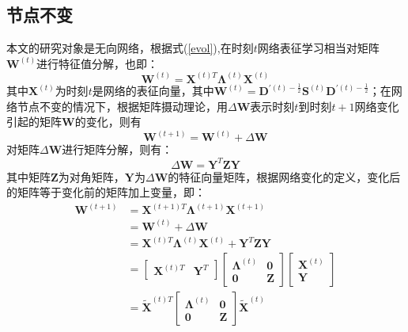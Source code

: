 \subsection{节点不变}
本文的研究对象是无向网络，根据式(\ref{evol}),在时刻$t$网络表征学习相当对矩阵$\textbf{W}^{(t)}$进行特征值分解，也即：
\begin{equation}
	\textbf{W}^{(t)} = \textbf{X}^{(t)T} \bm{\Lambda}^{(t)} \textbf{X} ^{(t)}
\end{equation}
其中$\textbf{X} ^{(t)}$为时刻$t$是网络的表征向量，其中$\textbf{W}^{(t)} = \textbf{D}^{\prime(t)-\frac{1}{2}}\textbf{S}^{(t)}\textbf{D}^{\prime(t)-\frac{1}{2}}$；在网络节点不变的情况下，根据矩阵摄动理论\cite{stewart1990matrix}，用$\Delta\textbf{W}$表示时刻$t$到时刻$t+1$网络变化引起的矩阵$\textbf{W}$的变化，则有
\begin{equation}
	\textbf{W}^{(t+1)} = \textbf{W}^{(t)} + \Delta\textbf{W}
\end{equation}
对矩阵$\Delta\textbf{W}$进行矩阵分解，则有：
\begin{equation}
	\Delta\textbf{W} =  \textbf{Y}^{T} \textbf{Z}  \textbf{Y}
\end{equation}
其中矩阵$\textbf{Z}$为对角矩阵，$\textbf{Y}$为$\Delta\textbf{W}$的特征向量矩阵，根据网络变化的定义，变化后的矩阵等于变化前的矩阵加上变量，即：
\begin{equation}\label{time_t1}
\begin{aligned}
\textbf{W}^{(t+1)} &= \textbf{X}^{(t+1)T} \bm{\Lambda}^{(t+1)} \textbf{X} ^{(t+1)} \\
 &= \textbf{W}^{(t)} + \Delta \textbf{W} \\
&= \textbf{X}^{(t)T}\bm{\Lambda}^{(t)} \textbf{X} ^{(t)} +  \textbf{Y}^{T} \textbf{Z}  \textbf{Y} \\
&= \begin{bmatrix} \textbf{X}^{(t)T} & \textbf{Y}^{T}\end{bmatrix}
   \begin{bmatrix}  \bm{\Lambda}^{(t)} & \textbf{0}\\
   \textbf{0} & \textbf{Z}
   \end{bmatrix}
   \begin{bmatrix} \textbf{X}^{(t)} \\ \textbf{Y}\end{bmatrix} \\
&= \tilde{\textbf{X}}^{(t)T} 
\begin{bmatrix}  \bm{\Lambda}^{(t)} & \textbf{0}\\
\textbf{0} & \textbf{Z}
\end{bmatrix}
\tilde{\textbf{X}}^{(t)}
\end{aligned}
\end{equation}
